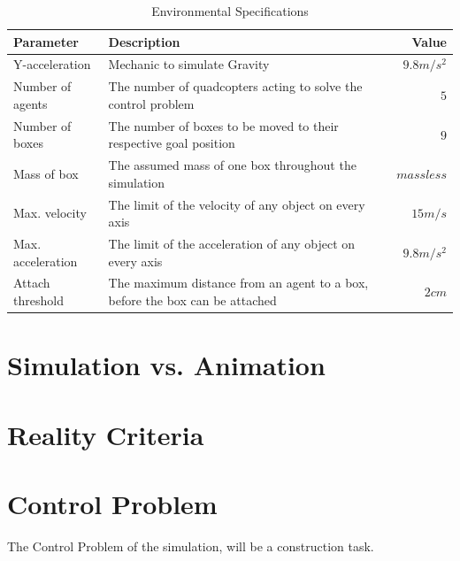 \begin{table}[H]
\centering
\begin{tabularx}{1\textwidth}{l@{ }Xr}
\toprule
\textbf{Parameter}   & \textbf{Description}                                                        & \textbf{Value} \\ \midrule
Y-acceleration       & Mechanic to simulate Gravity                                                & ${9.8m/s^2}$  \\
Number of agents     & The number of quadcopters acting to solve the control problem               & ${5}$          \\
Number of boxes      & The number of boxes to be moved to their respective goal position           & ${9}$              \\
Mass of box          & The assumed mass of one box throughout the simulation                       & ${massless}$       \\
Max. velocity     & The limit of the velocity of any object on every axis                       & ${15m/s}$         \\
Max. acceleration & The limit of the acceleration of any object on every axis                   & ${9.8m/s^2}$       \\
Attach threshold     & The maximum distance from an agent to a box, before the box can be attached & ${2cm}$           \\ \bottomrule
\end{tabularx}
\caption{Environmental Specifications}
\label{tab:env_specs}
\end{table}

\section{Simulation vs. Animation}
\label{sec:simulation_animation}


\section{Reality Criteria}
\label{sec:reality}

\section{Control Problem}
\label{sec:control_problem}
The Control Problem of the simulation, will be a construction task. 

